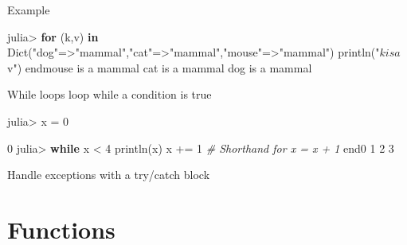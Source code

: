 \documentclass[ignorenonframetext,]{beamer}
\newenvironment{Shaded}{}{}
\newcommand{\KeywordTok}[1]{\textcolor[rgb]{0.00,0.44,0.13}{\textbf{{#1}}}}
\newcommand{\DataTypeTok}[1]{\textcolor[rgb]{0.56,0.13,0.00}{{#1}}}
\newcommand{\FloatTok}[1]{\textcolor[rgb]{0.25,0.63,0.44}{{#1}}}
\newcommand{\StringTok}[1]{\textcolor[rgb]{0.25,0.44,0.63}{{#1}}}
\newcommand{\CommentTok}[1]{\textcolor[rgb]{0.38,0.63,0.69}{\textit{{#1}}}}
\newcommand{\NormalTok}[1]{{#1}}
\begin{document}
\begin{frame}[fragile]{Example}

\begin{Shaded}
\begin{Highlighting}[]
\NormalTok{julia> }\KeywordTok{for} \NormalTok{(k,v) }\KeywordTok{in} \DataTypeTok{Dict}\NormalTok{(}\StringTok{"dog"}\NormalTok{=>}\StringTok{"mammal"}\NormalTok{,}\StringTok{"cat"}\NormalTok{=>}\StringTok{"mammal"}\NormalTok{,}\StringTok{"mouse"}\NormalTok{=>}\StringTok{"mammal"}\NormalTok{)}
    \NormalTok{println(}\StringTok{"$k is a $v"}\NormalTok{)}
\NormalTok{endmouse is a mammal}
\NormalTok{cat is a mammal}
\NormalTok{dog is a mammal}
\end{Highlighting}
\end{Shaded}

\end{frame}

\begin{frame}[fragile]{While loops loop while a condition is true}

\begin{Shaded}
\begin{Highlighting}[]
\NormalTok{julia> x = }\FloatTok{0}

\FloatTok{0}
\NormalTok{julia> }\KeywordTok{while} \NormalTok{x < }\FloatTok{4}
    \NormalTok{println(x)}
    \NormalTok{x += }\FloatTok{1}  \CommentTok{# Shorthand for x = x + 1}
\NormalTok{end0}
\FloatTok{1}
\FloatTok{2}
\FloatTok{3}
\end{Highlighting}
\end{Shaded}

\end{frame}

\begin{frame}[fragile]{Handle exceptions with a try/catch block}

\begin{Shaded}
\end{Shaded}

\end{frame}

\section{Functions}\label{functions}
\end{document}
